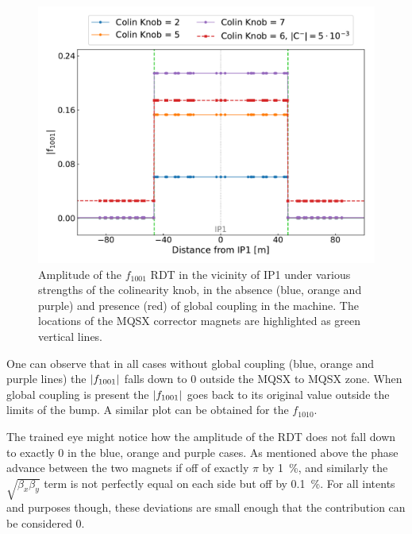 \begin{figure}[!htb]
    \centering
    \includegraphics*[width=\columnwidth]{Figures/IR_Coupling_Correction/colinearity_knob_effect.pdf}
    \caption{Amplitude of the \(f_{1001}\) RDT in the vicinity of IP\num{1} under various strengths of the colinearity knob, in the absence (\textcolor{mplblue}{blue}, \textcolor{mplorange}{orange} and \textcolor{mplpurple}{purple}) and presence (\textcolor{mplred}{red}) of global coupling in the machine. The locations of the MQSX corrector magnets are highlighted as \textcolor{mqsx_green}{green} vertical lines.}
    \label{figure:colinearity_knob_effect}
\end{figure}

One can observe that in all cases without global coupling (\textcolor{mplblue}{blue}, \textcolor{mplorange}{orange} and \textcolor{mplpurple}{purple} lines) the \(\left\lvert f_{1001} \right\rvert\) falls down to \num{0} outside the MQSX to MQSX zone.
When global coupling is present the \(\left\lvert f_{1001} \right\rvert\) goes back to its original value outside the limits of the bump.
A similar plot can be obtained for the \(f_{1010}\).

The trained eye might notice how the amplitude of the RDT does not fall down to exactly \num{0} in the \textcolor{mplblue}{blue}, \textcolor{mplorange}{orange} and \textcolor{mplpurple}{purple} cases.
As mentioned above the phase advance between the two magnets if off of exactly \(\pi\) by \qty{1}{\percent}, and similarly the \(\sqrt{\beta_x \beta_y}\) term is not perfectly equal on each side but off by \qty{0.1}{\percent}.
For all intents and purposes though, these deviations are small enough that the contribution can be considered \num{0}.
\newline

